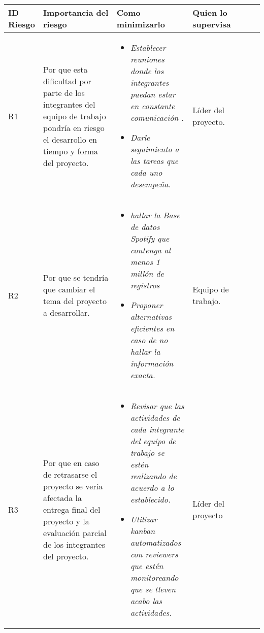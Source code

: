 \documentclass[12pt,a4paper]{article}
\begin{document}
\begin{table}[h!]
\begin{tabular}{|p{0.10\linewidth}|p{0.30\linewidth}|p{0.30\linewidth}|p{0.30\linewidth}}
\hline
\textbf{ID Riesgo}&\textbf{Importancia del riesgo}&\textbf{Como minimizarlo}&\textbf{Quien lo supervisa}
\\\hline
R1&Por que esta dificultad por parte de los integrantes del equipo de trabajo pondría en riesgo el desarrollo en tiempo y forma del proyecto.&\begin{itemize}
\item \textit{Establecer reuniones donde los integrantes puedan estar en constante comunicación .}
\item \textit{Darle seguimiento a las tareas que cada uno desempeña.}
\end{itemize}
&Líder del proyecto.\\\hline

R2&Por que se tendría que cambiar el tema del proyecto a desarrollar.&\begin{itemize}
\item \textit{hallar la Base de datos Spotify que contenga al menos 1 millón de registros}
\item \textit{Proponer alternativas eficientes en caso de no hallar la información exacta.}
\end{itemize}&Equipo de trabajo.\\\hline

R3&Por que en caso de retrasarse el proyecto se vería afectada la entrega final del proyecto y la evaluación parcial de los integrantes del proyecto.&\begin{itemize}
\item \textit{Revisar que las actividades de cada integrante del equipo de trabajo se estén realizando de acuerdo a lo establecido.}
\item \textit{Utilizar kanban automatizados con reviewers que estén monitoreando que se lleven acabo las actividades.}
\end{itemize} 
&Líder del proyecto\\\hline



\end{tabular}
\end{table}
\end{document}
